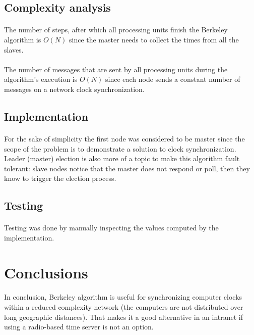 \documentclass[12pt]{article}
\begin{document}
\subsection{Complexity analysis}
\paragraph{}
The number of steps, after which all processing units finish the Berkeley algorithm is $O(N)$ since the master needs to collect the times from all the slaves.

\paragraph{}
The number of messages that are sent by all processing units during the algorithm's execution is $O(N)$ since each node sends a constant number of messages on a network clock synchronization.


\subsection{Implementation}
\paragraph{}
For the sake of simplicity the first node was considered to be master since the scope of the problem is to demonstrate a solution to clock synchronization. Leader (master) election is also more of a topic to make this algorithm fault tolerant: slave nodes notice that the master does not respond or poll, then they know to trigger the election process.

\subsection{Testing}
\paragraph{}
Testing was done by manually inspecting the values computed by the implementation.

\section{Conclusions}
\paragraph{}
In conclusion, Berkeley algorithm is useful for synchronizing computer clocks within a reduced complexity network (the computers are not distributed over long geographic distances). That makes it a good alternative in an intranet if using a radio-based time server is not an option.

\printbibliography
\end{document}
